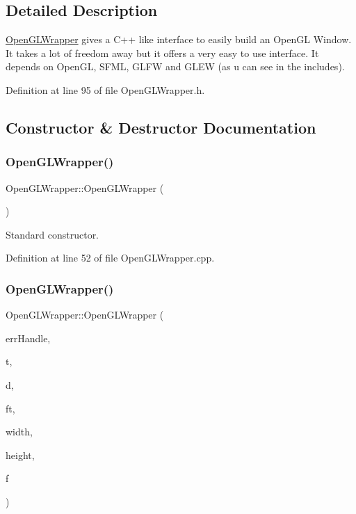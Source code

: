 \subsection{Detailed Description}
\mbox{\hyperlink{classOpenGLWrapper}{Open\+G\+L\+Wrapper}} gives a C++ like interface to easily build an Open\+GL Window. It takes a lot of freedom away but it offers a very easy to use interface. It depends on Open\+GL, S\+F\+ML, G\+L\+FW and G\+L\+EW (as u can see in the includes). 

Definition at line 95 of file Open\+G\+L\+Wrapper.\+h.



\subsection{Constructor \& Destructor Documentation}
\mbox{\label{classOpenGLWrapper_a841f4d85a65a5614618a986c395e85a0}} 
\subsubsection{\texorpdfstring{OpenGLWrapper()}{OpenGLWrapper()}\hspace{0.1cm}{\footnotesize\ttfamily [1/3]}}
{\footnotesize\ttfamily Open\+G\+L\+Wrapper\+::\+Open\+G\+L\+Wrapper (\begin{DoxyParamCaption}{ }\end{DoxyParamCaption})}



Standard constructor. 



Definition at line 52 of file Open\+G\+L\+Wrapper.\+cpp.

\mbox{\label{classOpenGLWrapper_acb09341d671225fbed6b11ec23aa095f}} 
\subsubsection{\texorpdfstring{OpenGLWrapper()}{OpenGLWrapper()}\hspace{0.1cm}{\footnotesize\ttfamily [2/3]}}
{\footnotesize\ttfamily Open\+G\+L\+Wrapper\+::\+Open\+G\+L\+Wrapper (\begin{DoxyParamCaption}\item[{\mbox{\hyperlink{classErrorHandler}{Error\+Handler}} $\ast$}]{err\+Handle,  }\item[{std\+::string}]{t,  }\item[{unsigned char $\ast$}]{d,  }\item[{std\+::string}]{ft,  }\item[{int}]{width,  }\item[{int}]{height,  }\item[{int($\ast$)(int)}]{f }\end{DoxyParamCaption})}



